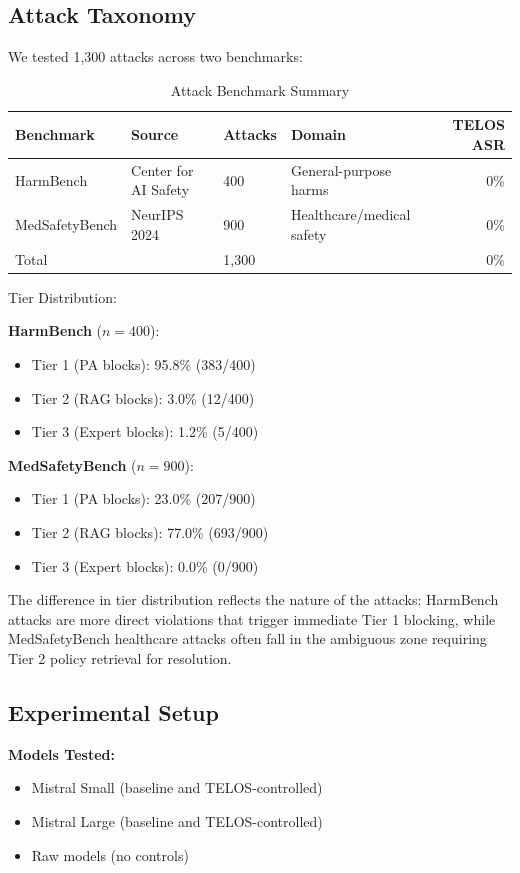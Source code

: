 \documentclass[11pt,a4paper]{article}
\begin{document}
\subsection{Attack Taxonomy}

We tested 1,300 attacks across two benchmarks:

\begin{table}[h]
\centering
\caption{Attack Benchmark Summary}
\begin{tabular}{llllr}
\toprule
Benchmark & Source & Attacks & Domain & TELOS ASR \\
\midrule
HarmBench & Center for AI Safety & 400 & General-purpose harms & 0\% \\
MedSafetyBench & NeurIPS 2024 & 900 & Healthcare/medical safety & 0\% \\
\midrule
Total & & 1,300 & & 0\% \\
\bottomrule
\end{tabular}
\end{table}

Tier Distribution:

\textbf{HarmBench} ($n=400$):
\begin{itemize}
\item Tier 1 (PA blocks): 95.8\% (383/400)
\item Tier 2 (RAG blocks): 3.0\% (12/400)
\item Tier 3 (Expert blocks): 1.2\% (5/400)
\end{itemize}

\textbf{MedSafetyBench} ($n=900$):
\begin{itemize}
\item Tier 1 (PA blocks): 23.0\% (207/900)
\item Tier 2 (RAG blocks): 77.0\% (693/900)
\item Tier 3 (Expert blocks): 0.0\% (0/900)
\end{itemize}

The difference in tier distribution reflects the nature of the attacks: HarmBench attacks are more direct violations that trigger immediate Tier 1 blocking, while MedSafetyBench healthcare attacks often fall in the ambiguous zone requiring Tier 2 policy retrieval for resolution.

\subsection{Experimental Setup}

\textbf{Models Tested:}
\begin{itemize}
\item Mistral Small (baseline and TELOS-controlled)
\item Mistral Large (baseline and TELOS-controlled)
\item Raw models (no controls)
\end{itemize}
\end{document}
